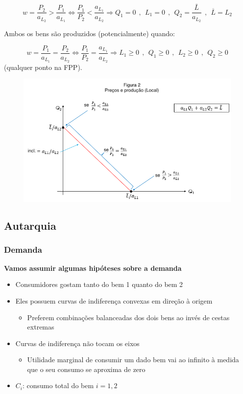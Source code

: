 \documentclass[a4paper,12pt]{article}[abntex2]
\begin{document}
\[
w = \frac{P_2}{a_{L_2}} > \frac{P_1}{a_{L_1}} \iff \frac{P_1}{P_2} < \frac{a_{L_1}}{a_{L_2}} \Rightarrow Q_1 = 0 \ \ ,\ \ L_1=0 \ \ , \ \  Q_2 = \frac{\bar{L}}{a_{L_2}} \ \ , \ \ \overline{L}=L_2
\]

Ambos os bens são produzidos (potencialmente) quando:

\[
w = \frac{P_1}{a_{L_1}} = \frac{P_2}{a_{L_2}} \iff \frac{P_1}{P_2} = \frac{a_{L_1}}{a_{L_2}} \Rightarrow L_1 \ge 0 \ \ , \ \ Q_1 \geq 0 \ \ , \ \ L_2 \ge 0 \ \ , \ \ Q_2 \geq 0
\] (qualquer ponto na FPP).

\begin{figure}[H]
    \centering
    \includegraphics[width=0.7\linewidth]{Imagens/a7i2.png}
\end{figure}

\subsection{\textbf{Autarquia}}
\subsubsection{\textbf{Demanda}}
\textbf{Vamos assumir algumas hipóteses sobre a demanda}\begin{itemize}
    \item Consumidores gostam tanto do bem 1 quanto do bem 2
    \item Eles possuem curvas de indiferença convexas em direção à origem\begin{itemize}
        \item Preferem combinações balanceadas dos dois bens ao invés de cestas extremas 
    \end{itemize}
    \item Curvas de indiferença não tocam os eixos\begin{itemize}
        \item Utilidade marginal de consumir um dado bem vai ao infinito à medida que o seu consumo se aproxima de zero
    \end{itemize}
    \item \(C_i\): consumo total do bem \(i=1,2\)
\end{itemize}
\end{document}
